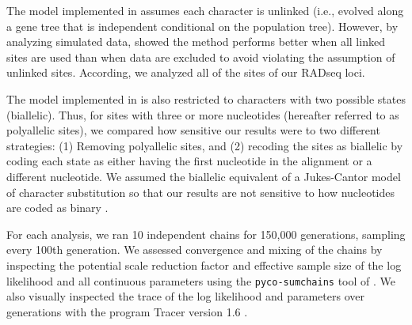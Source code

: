 The model implemented in \ecoevolity assumes each character is unlinked (i.e.,
evolved along a gene tree that is independent conditional on the population
tree).
However, by analyzing simulated data, \citet{Oaks2018ecoevolity} showed
the method performs better when all linked sites are used than when data are
excluded to avoid violating the assumption of unlinked sites.
According, we analyzed all of the sites of our
RADseq loci.

The model implemented in \ecoevolity is also restricted to characters with two
possible states (biallelic).
Thus, for sites with three or more nucleotides (hereafter referred to as
polyallelic sites), we compared how sensitive our
results were to two different strategies:
(1) Removing polyallelic sites, and
(2) recoding the sites as biallelic by coding each state as either having the
first nucleotide in the alignment or a different nucleotide.
We assumed the biallelic equivalent of a Jukes-Cantor model of character
substitution \citep{JC1969} so that our results are not sensitive to how
nucleotides are coded as binary
\citep{Oaks2018ecoevolity}.

For each analysis, we ran 10 independent
chains for 150,000 generations,
sampling every 100th generation.
We assessed convergence and mixing of the chains by inspecting the potential
scale reduction factor \citet[the square root of Equation 1.1 in][]{Brooks1998}
and effective sample size \citep{Gong2014} of the log likelihood and all
continuous parameters using the \texttt{pyco-sumchains} tool of \pycoevolity.
We also visually inspected the trace of the log likelihood and parameters over
generations with the program Tracer version 1.6 \citep{Tracer16}.



